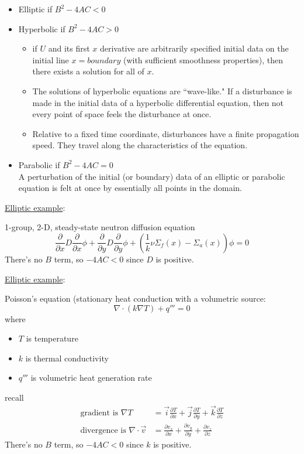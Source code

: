 \documentclass[12pt]{article}
\newcommand{\Macro}{\ensuremath{\Sigma}}
\begin{document}
\begin{itemize}
\item Elliptic if $B^2 - 4 AC < 0$
\item Hyperbolic if $B^2 - 4 AC > 0$
  \begin{itemize}
  \item if $U$ and its first $x$ derivative are arbitrarily specified initial data on the initial line $x = boundary$ (with sufficient smoothness properties), then there exists a solution for all of $x$.
  \item The solutions of hyperbolic equations are ``wave-like." If a disturbance is made in the initial data of a hyperbolic differential equation, then not every point of space feels the disturbance at once.
  \item Relative to a fixed time coordinate, disturbances have a finite propagation speed. They travel along the characteristics of the equation.
  \end{itemize}
\item Parabolic if $B^2 - 4 AC = 0$\\ A perturbation of the initial (or boundary) data of an elliptic or parabolic equation is felt at once by essentially all points in the domain.
\end{itemize}

\vspace*{1em}
\noindent \underline{Elliptic example}:

1-group, 2-D, steady-state neutron diffusion equation
%
\begin{equation}
\frac{\partial}{\partial x}D\frac{\partial}{\partial x}\phi + \frac{\partial}{\partial y}D\frac{\partial}{\partial y}\phi + (\frac{1}{k} \nu \Macro_f(x) - \Macro_a(x)) \phi = 0 \nonumber
\end{equation}
%
There's no $B$ term, so $-4AC < 0$ since $D$ is positive.

\vspace*{1em}
\noindent \underline{Elliptic example}:

Poisson's equation (stationary heat conduction with a volumetric source:
%
\begin{equation}
\nabla \cdot (k \nabla T) + q''' = 0 \nonumber
\end{equation}
% 
where
\begin{itemize}
\item $T$ is temperature
\item $k$ is thermal conductivity
\item $q'''$ is volumetric heat generation rate
\end{itemize}
%
recall
%
\begin{align}
\text{gradient is } \nabla T &= \vec{i}\frac{\partial T}{\partial x} + \vec{j}\frac{\partial T}{\partial y} + \vec{k}\frac{\partial T}{\partial z} \nonumber \\
%
\text{divergence is } \nabla \cdot \vec{v} &= \frac{\partial v_x}{\partial x} + \frac{\partial v_y}{\partial y} + \frac{\partial v_z}{\partial z} \nonumber
\end{align}
%
There's no $B$ term, so $-4AC < 0$ since $k$ is positive.
\end{document}
